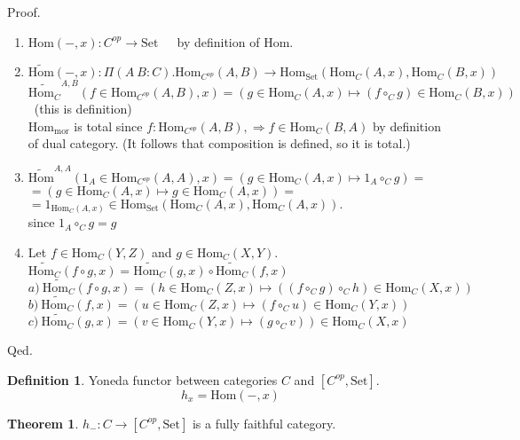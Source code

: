 \documentclass[10pt,a4paper]{article}
\theoremstyle{definition}
\newtheorem{definition}{Definition}[section]
\newtheorem{theorem}{Theorem}[section]
\newcommand{\Hom}{{\mbox{Hom}}}
\newcommand{\mor}{{\mbox{mor}}}
\newcommand{\Set}{{\mbox{Set}}}
\newcommand{\ra}{{\rightarrow}}
\begin{document}
\noindent Proof.
\begin{enumerate}
\item $\Hom(-, x) : C^{op} \ra \Set$\ \ \ by definition of $\Hom$.
\item $\widetilde{\Hom}(-, x) :\Pi(A\ B:C).\Hom_{C^{op}}(A,B) \ra \Hom_\Set(\Hom_C(A,x), \Hom_C(B,x))$\\
$\widetilde{\Hom_C}^{A,B}(f\in\Hom_{C^{op}}(A,B), x) = (g \in\Hom_C(A,x) \mapsto (f \circ_C g) \in\Hom_C(B,x))$\ (this is definition)\\
$\Hom_\mor$ is total since $f:\Hom_{C^{op}}(A,B), \Rightarrow f\in\Hom_C(B,A)$ by definition of dual category. (It follows that composition is defined, so it is total.)
\item $\widetilde{\Hom}^{A,A}(1_A\in\Hom_{C^{op}}(A,A), x) = \left(g \in\Hom_C(A,x)\mapsto 1_A \circ_C g\right) = $\\
$= \left(g \in\Hom_C(A,x) \mapsto g \in\Hom_C(A,x)\right) =$\\
$= 1_{\Hom_C(A,x)} \in \Hom_\Set\left(\Hom_C(A,x), \Hom_C(A,x)\right).$\\
since $1_A \circ_C g = g$\\
\item Let $f\in\Hom_C(Y,Z)$ and $g\in\Hom_C(X,Y)$.\\
$\widetilde{\Hom_C}(f\circ g, x) = \widetilde{\Hom_C}(g, x) \circ \widetilde{\Hom_C}(f, x)$\\
$a)\ \widetilde{\Hom_C}(f\circ g, x) = (h \in\Hom_C(Z,x) \mapsto ((f\circ_C g) \circ_C h)\in\Hom_C(X,x))$\\
$b)\ \widetilde{\Hom_C}(f, x) = (u \in\Hom_C(Z,x) \mapsto (f \circ_C u)\in\Hom_C(Y,x))$\\
$c)\ \widetilde{\Hom_C}(g, x) = (v \in\Hom_C(Y,x) \mapsto (g \circ_C v))\in\Hom_C(X,x)$\\
\end{enumerate}
Qed.
\begin{definition}
Yoneda functor between categories $C$ and $[C^{op},\Set]$.
$$h_x = \Hom(-, x)$$
\end{definition}
\begin{theorem}
$h_{-}:C\rightarrow [C^{op},\Set]$ is a fully faithful category.
\end{theorem}
\end{document}

